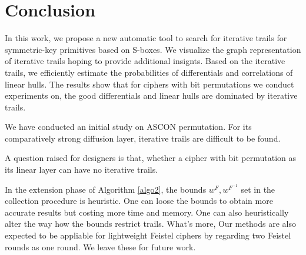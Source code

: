 \section{Conclusion\label{sec:conclusion}}

In this work, we propose a new automatic tool to search for iterative trails for symmetric-key primitives based on S-boxes. We visualize the graph representation of iterative trails hoping to provide additional insignts. Based on the iterative trails, we efficiently estimate the probabilities of differentials and correlations of linear hulls. The results show that for ciphers with bit permutations we conduct experiments on, the good differentials and linear hulls are dominated by iterative trails. 

We have conducted an initial study on ASCON permutation. For its comparatively strong diffusion layer, iterative trails are difficult to be found. 

A question raised for designers is that, whether a cipher with bit permutation as its linear layer can have no iterative trails. 

In the extension phase of Algorithm \ref{algo2}, the bounds $w^{F},w^{F^{-1}}$ set in the collection procedure is heuristic. One can loose the bounds to obtain more accurate results but costing more time and memory. One can also heuristically alter the way how the bounds restrict trails. What's more, Our methods are also expected to be appliable for lightweight Feistel ciphers by regarding two Feistel rounds as one round. We leave these for future work. 

